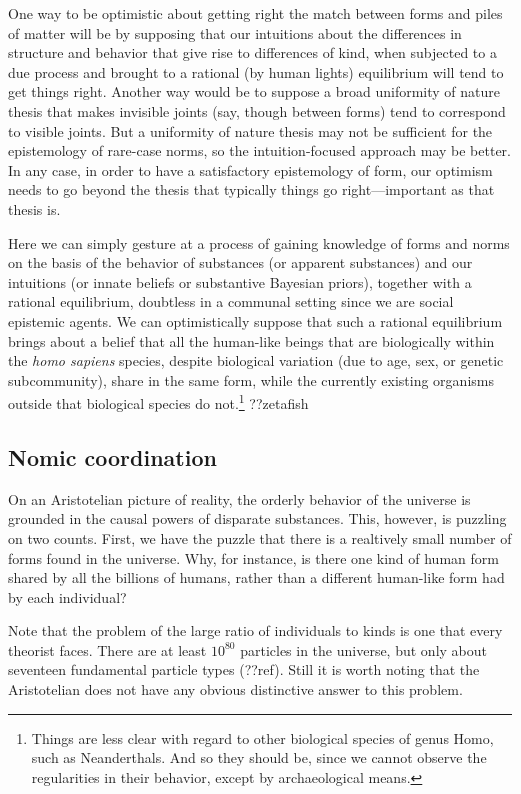 One way to be optimistic about getting right the match between forms and piles of matter will be by supposing that 
our intuitions about the differences in structure and behavior that give rise to differences of kind, when subjected 
to a due process and brought to a rational (by human lights) equilibrium will tend to get things right. Another way 
would be to suppose a broad uniformity of nature thesis that makes invisible joints (say, though between forms) tend to 
correspond to visible joints. But a uniformity of nature thesis may not be sufficient for the epistemology of rare-case 
norms, so the intuition-focused approach may be better. In any case, in order to have a satisfactory epistemology of form,
our optimism needs to go beyond the thesis that typically things go right---important as that thesis is.

Here we can simply gesture at a process of gaining knowledge of forms and norms on the basis of the behavior of 
substances (or apparent substances) and our intuitions (or innate beliefs or substantive Bayesian priors), together 
with a rational equilibrium, doubtless in a communal setting since we are social epistemic agents. We can optimistically
suppose that such a rational equilibrium brings about a belief that all the human-like beings that are biologically 
within the \textit{homo sapiens} species, despite biological variation (due to age, sex, or genetic subcommunity), share 
in the same form, while the currently existing organisms outside that biological species do not.\footnote{Things are less
clear with regard to other biological species of genus Homo, such as Neanderthals. And so they should be, since we cannot
observe the regularities in their behavior, except by archaeological means.} ??zetafish

\subsection{Nomic coordination}
On an Aristotelian picture of reality, the orderly behavior of the universe is grounded in the causal powers of 
disparate substances. This, however, is puzzling on two counts. First, we have the puzzle that there is a 
realtively small number of forms found in the universe. Why, for instance, is there one kind of human form shared by all 
the billions of humans, rather than a different human-like form had by each individual? 

Note that the problem of the large ratio of individuals to kinds is one that every theorist faces. There are at least $10^{80}$ 
particles in the universe, but only about seventeen fundamental particle types (??ref). Still it is worth noting that the 
Aristotelian does not have any obvious distinctive answer to this problem. 

